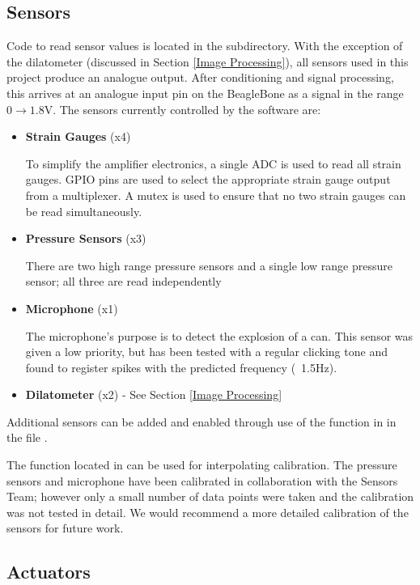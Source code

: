 \subsection{Sensors}

Code to read sensor values is located in the  subdirectory. With the exception of the dilatometer (discussed in Section \ref{Image Processing}), all sensors used in this project produce an analogue output. After conditioning and signal processing, this arrives at an analogue input pin on the BeagleBone as a signal in the range $0\to1.8\text{V}$. The sensors currently controlled by the software are:

\begin{itemize}
	\item {\bf Strain Gauges} (x4)

	To simplify the amplifier electronics, a single ADC is used to read all strain gauges. GPIO pins are used to select the appropriate strain gauge output from a multiplexer. A mutex is used to ensure that no two strain gauges can be read simultaneously.


	\item {\bf Pressure Sensors} (x3)

	 There are two high range pressure sensors and a single low range pressure sensor; all three are read independently
	\item {\bf Microphone} (x1) 

	The microphone's purpose is to detect the explosion of a can. This sensor was given a low priority, but has been tested with a regular clicking tone and found to register spikes with the predicted frequency (~1.5Hz).
	\item {\bf Dilatometer} (x2) - See Section \ref{Image Processing}
\end{itemize}

Additional sensors can be added and enabled through use of the  function in  in the file .

The function  located in  can be used for interpolating calibration. The pressure sensors and microphone have been calibrated in collaboration with the Sensors Team; however only a small number of data points were taken and the calibration was not tested in detail. We would recommend a more detailed calibration of the sensors for future work.

\subsection{Actuators}

